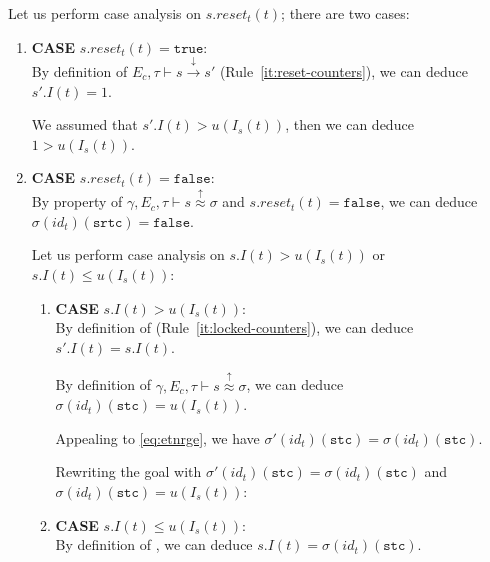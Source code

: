 \documentclass[dvipsnames,12pt]{article}
\begin{document}
\begin{niproof}
\begin{enumerate}
\begin{enumerate}
        Let us perform case analysis on $s.reset_t(t)$; there are two
        cases:
        \begin{enumerate}
        \item \textbf{CASE} $s.reset_t(t)=\mathtt{true}$:\\
          By definition of
          $E_c,\tau\vdash{}s\xrightarrow{\downarrow}s'$
          (Rule~\ref{it:reset-counters}), we can deduce $s'.I(t)=1$.

          \noindent{}We assumed that $s'.I(t)>u(I_s(t))$, then we
          can deduce $1>u(I_s(t))$.


        \item \textbf{CASE} $s.reset_t(t)=\mathtt{false}$:\\
          By property of
          $\gamma,E_c,\tau\vdash{}s\stackrel{\uparrow}{\approx}\sigma$
          and $s.reset_t(t)=\mathtt{false}$, we can deduce
          $\sigma(id_t)(\texttt{srtc})=\mathtt{false}$.
          
          Let us perform case analysis on $s.I(t)>{}u(I_s(t))$ or
          $s.I(t)\le{}u(I_s(t))$:
          \begin{enumerate}
          \item \textbf{CASE} $s.I(t)>u(I_s(t))$: \\
            By definition of \dwSitpn (Rule~\ref{it:locked-counters}),
            we can deduce $s'.I(t)=s.I(t)$.
            
            By definition of
            $\gamma,E_c,\tau\vdash{}s\stackrel{\uparrow}{\approx}\sigma$,
            we can deduce $\sigma(id_t)(\texttt{stc})=u(I_s(t))$.

            Appealing to \eqref{eq:etnrge}, we have
            $\sigma'(id_t)(\texttt{stc})=\sigma(id_t)(\texttt{stc})$.

            Rewriting the goal with
            $\sigma'(id_t)(\texttt{stc})=\sigma(id_t)(\texttt{stc})$ and
            $\sigma(id_t)(\texttt{stc})=u(I_s(t))$: 
            
          \item \textbf{CASE} $s.I(t)\le{}u(I_s(t))$: \\

            By definition of \upSim, we can deduce
            $s.I(t)=\sigma(id_t)(\texttt{stc})$.
            

\end{enumerate}
\end{enumerate}
\end{enumerate}
\end{enumerate}
\end{niproof}
\end{document}
